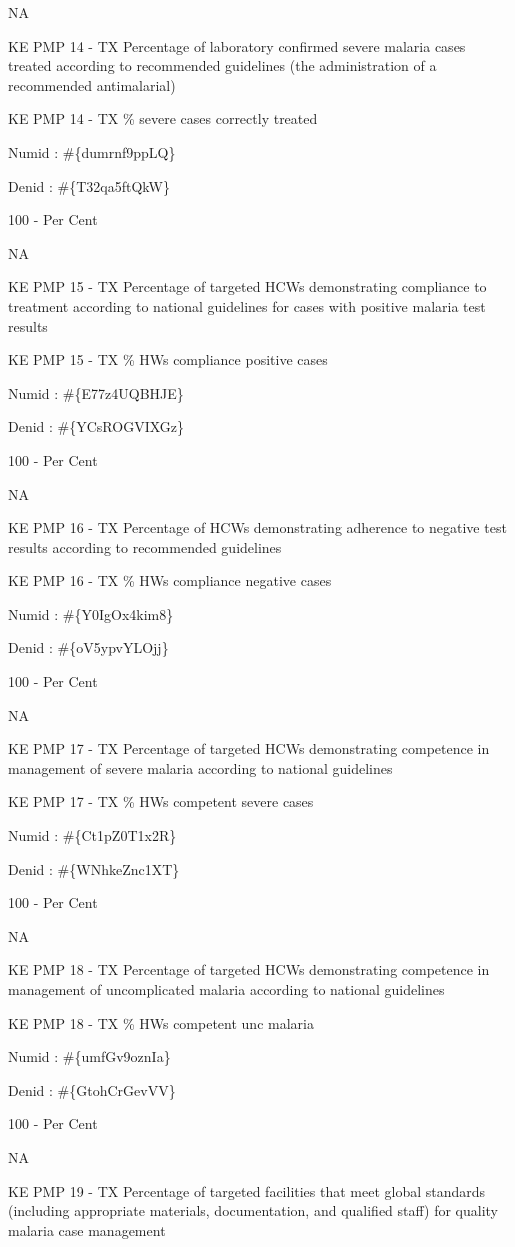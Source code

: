 \documentclass[]{book}
\begin{document}
NA

KE PMP 14 - TX Percentage of laboratory confirmed severe malaria cases treated according to recommended guidelines (the administration of a recommended antimalarial)

KE PMP 14 - TX \% severe cases correctly treated

Numid : \#\{dumrnf9ppLQ\}

Denid : \#\{T32qa5ftQkW\}

100 - Per Cent

NA

KE PMP 15 - TX Percentage of targeted HCWs demonstrating compliance to treatment according to national guidelines for cases with positive malaria test results

KE PMP 15 - TX \% HWs compliance positive cases

Numid : \#\{E77z4UQBHJE\}

Denid : \#\{YCsROGVIXGz\}

100 - Per Cent

NA

KE PMP 16 - TX Percentage of HCWs demonstrating adherence to negative test results according to recommended guidelines

KE PMP 16 - TX \% HWs compliance negative cases

Numid : \#\{Y0IgOx4kim8\}

Denid : \#\{oV5ypvYLOjj\}

100 - Per Cent

NA

KE PMP 17 - TX Percentage of targeted HCWs demonstrating competence in management of severe malaria according to national guidelines

KE PMP 17 - TX \% HWs competent severe cases

Numid : \#\{Ct1pZ0T1x2R\}

Denid : \#\{WNhkeZnc1XT\}

100 - Per Cent

NA

KE PMP 18 - TX Percentage of targeted HCWs demonstrating competence in management of uncomplicated malaria according to national guidelines

KE PMP 18 - TX \% HWs competent unc malaria

Numid : \#\{umfGv9oznIa\}

Denid : \#\{GtohCrGevVV\}

100 - Per Cent

NA

KE PMP 19 - TX Percentage of targeted facilities that meet global standards (including appropriate materials, documentation, and qualified staff) for quality malaria case management
\end{document}
